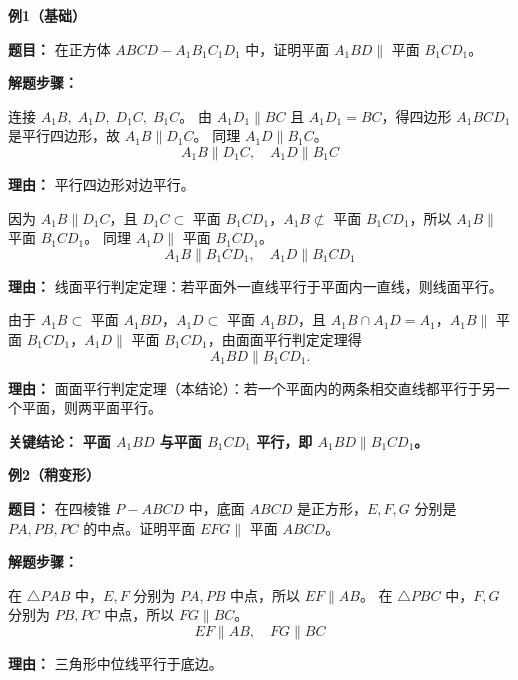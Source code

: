 \begin{examplebox}
	\textbf{\textcolor{CExample}{例1（基础）}}

	\textbf{\textcolor{CExample}{题目：}}
	在正方体 $ABCD-A_1B_1C_1D_1$ 中，证明平面 $A_1BD\parallel$ 平面 $B_1CD_1$。

	\textbf{\textcolor{CExample}{解题步骤：}}
	\begin{description}[style=nextline, leftmargin=2.8em, labelsep=0.5em, itemsep=0.45em]
		\item[\textbf{第一步（线线平行）：}] 连接 $A_1B,\;A_1D,\;D_1C,\;B_1C$。
			由 $A_1D_1\parallel BC$ 且 $A_1D_1=BC$，得四边形 $A_1BCD_1$ 是平行四边形，故 $A_1B\parallel D_1C$。
			同理 $A_1D\parallel B_1C$。
			\[
				A_1B\parallel D_1C,\quad A_1D\parallel B_1C
			\]
			\par\textbf{理由：}
			平行四边形对边平行。

		\item[\textbf{第二步（线面平行）：}]
			因为 $A_1B\parallel D_1C$，且 $D_1C\subset$ 平面 $B_1CD_1$，$A_1B\not\subset$ 平面 $B_1CD_1$，所以 $A_1B\parallel$ 平面 $B_1CD_1$。
			同理 $A_1D\parallel$ 平面 $B_1CD_1$。
			\[
				A_1B\parallel B_1CD_1,\quad A_1D\parallel B_1CD_1
			\]
			\par\textbf{理由：}
			线面平行判定定理：若平面外一直线平行于平面内一直线，则线面平行。

		\item[\textbf{第三步（面面平行）：}]
			由于 $A_1B\subset$ 平面 $A_1BD$，$A_1D\subset$ 平面 $A_1BD$，且 $A_1B\cap A_1D=A_1$，$A_1B\parallel$ 平面 $B_1CD_1$，$A_1D\parallel$ 平面 $B_1CD_1$，由面面平行判定定理得
			\[
				A_1BD\parallel B_1CD_1.
			\]
			\par\textbf{理由：}
			面面平行判定定理（本结论）：若一个平面内的两条相交直线都平行于另一个平面，则两平面平行。
	\end{description}

	\textbf{\textcolor{CExample}{关键结论：}}
	\textbf{平面 $A_1BD$ 与平面 $B_1CD_1$ 平行，即 $A_1BD\parallel B_1CD_1$。}

	\medskip
	\textbf{\textcolor{CExample}{例2（稍变形）}}

	\textbf{\textcolor{CExample}{题目：}}
	在四棱锥 $P-ABCD$ 中，底面 $ABCD$ 是正方形，$E,F,G$ 分别是 $PA,PB,PC$ 的中点。证明平面 $EFG\parallel$ 平面 $ABCD$。

	\textbf{\textcolor{CExample}{解题步骤：}}
	\begin{description}[style=nextline, leftmargin=2.8em, labelsep=0.5em, itemsep=0.45em]
		\item[\textbf{第一步（中位线平行）：}]
			在 $\triangle PAB$ 中，$E,F$ 分别为 $PA,PB$ 中点，所以 $EF\parallel AB$。
			在 $\triangle PBC$ 中，$F,G$ 分别为 $PB,PC$ 中点，所以 $FG\parallel BC$。
			\[
				EF\parallel AB,\quad FG\parallel BC
			\]
			\par\textbf{理由：}
			三角形中位线平行于底边。


\end{description}
\end{examplebox}
